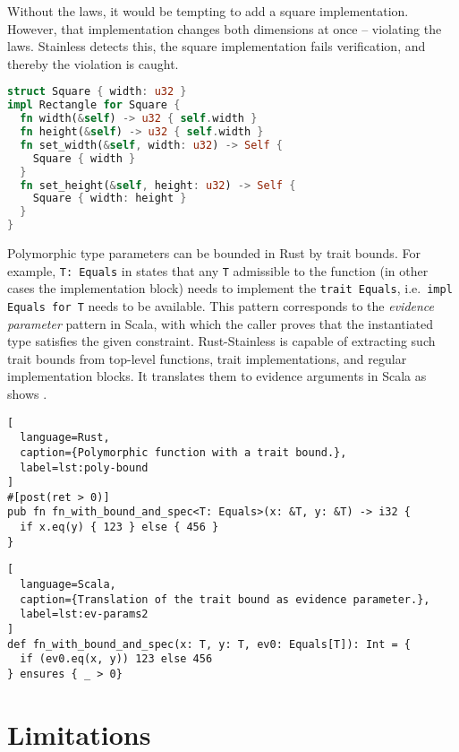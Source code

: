 Without the laws, it would be tempting to add a square implementation.
However, that implementation changes both dimensions at once --
violating the laws. Stainless detects this, the square implementation
fails verification, and thereby the violation is caught.

\begin{lstlisting}[language=Rust, caption={Example implementation violating the laws.}]
struct Square { width: u32 }
impl Rectangle for Square {
  fn width(&self) -> u32 { self.width }
  fn height(&self) -> u32 { self.width }
  fn set_width(&self, width: u32) -> Self {
    Square { width }
  }
  fn set_height(&self, height: u32) -> Self {
    Square { width: height }
  }
}
\end{lstlisting}

Polymorphic type parameters can be bounded in Rust by trait bounds. For example,
\lstinline!T: Equals! in  states that any \lstinline!T!
admissible to the function (in other cases the implementation block) needs to
implement the \passthrough{\lstinline!trait Equals!},
i.e.~\lstinline!impl Equals for T! needs to be available. This pattern
corresponds to the \emph{evidence parameter} pattern in Scala, with which the
caller proves that the instantiated type satisfies the given constraint.
Rust-Stainless is capable of extracting such trait bounds from top-level
functions, trait implementations, and regular implementation blocks. It
translates them to evidence arguments in Scala as shows .

\begin{lstlisting}[
  language=Rust,
  caption={Polymorphic function with a trait bound.},
  label=lst:poly-bound
]
#[post(ret > 0)]
pub fn fn_with_bound_and_spec<T: Equals>(x: &T, y: &T) -> i32 {
  if x.eq(y) { 123 } else { 456 }
}
\end{lstlisting}

\begin{lstlisting}[
  language=Scala,
  caption={Translation of the trait bound as evidence parameter.},
  label=lst:ev-params2
]
def fn_with_bound_and_spec(x: T, y: T, ev0: Equals[T]): Int = {
  if (ev0.eq(x, y)) 123 else 456
} ensures { _ > 0}
\end{lstlisting}

\begin{quote}
\end{quote}




\section{Limitations}
\label{impl-limitations}
